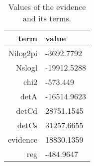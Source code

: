 \begin{table*}\caption{Values of the evidence and its terms.}\begin{center}\begin{tabular}{ r l } term & value \\
\hline Nilog2pi & -3692.7792 \\ 
Nslogl & -19912.5288 \\ 
chi2 & -573.449 \\ 
detA & -16514.9623 \\ 
detCd & 28751.1545 \\ 
detCs & 31257.6655 \\ 
evidence & 18830.1359 \\ 
reg & -484.9647 \\ 
\hline\end{tabular}\end{center}\label{tab:2}\end{table*}